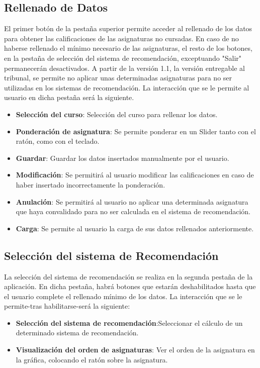 \subsection{Rellenado de Datos}
El primer botón de la pestaña superior permite acceder al rellenado de los datos para obtener las calificaciones de las asignaturas no cursadas. En caso de no haberse rellenado el mínimo necesario de las asignaturas, el resto de los botones, en la pestaña de selección del sistema de recomendación, exceptuando "Salir" permanecerán desactivados.  A partir de la versión 1.1, la versión entregable al tribunal, se permite no aplicar unas determinadas asignaturas para no ser utilizadas en los sistemas de recomendación. 
La interacción que se le permite al usuario en dicha pestaña será la siguiente. 
\begin{itemize}
\item \textbf{Selección del curso}: Selección del curso para rellenar los datos. 
\item \textbf{Ponderación de asignatura}: Se permite ponderar en un Slider tanto con el ratón, como con el teclado.
\item \textbf{Guardar}: Guardar los datos insertados  manualmente  por el usuario. 
\item \textbf{Modificación}: Se permitirá al usuario modificar las calificaciones en caso de haber insertado incorrectamente la ponderación. 
\item \textbf{Anulación}: Se permitirá al usuario no aplicar una determinada asignatura que haya convalidado para no ser calculada en el sistema de recomendación. 
\item \textbf{Carga}: Se permite al usuario la carga de sus datos rellenados anteriormente. 
\end{itemize}

\subsection{Selección del sistema de Recomendación}
La selección del sistema de recomendación se realiza en la segunda pestaña de la aplicación. En dicha pestaña, habrá botones que  estarán deshabilitados hasta que el usuario complete el rellenado mínimo de los datos. 
La interacción que se le permite-tras habilitarse-será la siguiente: 
\begin{itemize}
\item \textbf{Selección del sistema de recomendación}:Seleccionar el cálculo de un determinado sistema de recomendación. 
\item \textbf{Visualización del orden de asignaturas}: Ver el orden de la asignatura en la gráfica, colocando el ratón sobre la asignatura. 
\end{itemize}

